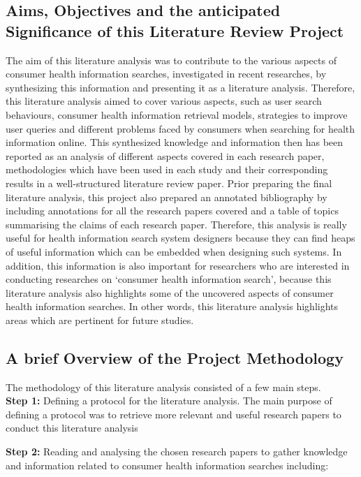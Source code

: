 \documentclass[]{article}
\begin{document}
\subsection{Aims, Objectives and the anticipated Significance of this Literature Review Project}
	
The aim of this literature analysis was to contribute to the various aspects of consumer health information searches, investigated in recent researches, by synthesizing this information and presenting it as a literature analysis. Therefore, this literature analysis aimed to cover various aspects, such as user search behaviours, consumer health information retrieval models, strategies to improve user queries and different problems faced by consumers when searching for health information online. This synthesized knowledge and information then has been reported as an analysis of different aspects covered in each research paper, methodologies which have been used in each study and their corresponding results in a well-structured literature review paper. Prior preparing the final literature analysis, this project also prepared an annotated bibliography by including annotations for all the research papers covered and a table of topics summarising the claims of each research paper. Therefore, this analysis is really useful for health information search system designers because they can find heaps of useful information which can be embedded when designing such systems. In addition, this information is also important for researchers who are interested in conducting researches on ‘consumer health information search’, because this literature analysis also highlights some of the uncovered aspects of consumer health information searches. In other words, this literature analysis highlights areas which are pertinent for future studies.	
	
\subsection{A brief Overview of the Project Methodology}
	
The methodology of this literature analysis consisted of a few main steps.\\
	
\textbf{Step 1:} Defining a protocol for the literature analysis. The main purpose of defining a protocol was to retrieve more relevant and useful research papers to conduct this literature analysis 
	
\textbf{Step 2:} Reading and analysing the chosen research papers to gather knowledge and information related to consumer health information searches including:
\end{document}
